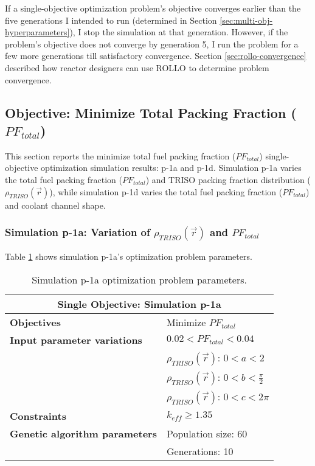 If a single-objective optimization problem's objective converges earlier than the 
five generations I intended to run (determined in Section 
\ref{sec:multi-obj-hyperparameters}), I stop the simulation at that generation.
However, if the problem's objective does not converge by generation 5, I run the 
problem for a few more generations till satisfactory convergence.
Section \ref{sec:rollo-convergence} described how reactor designers can use 
\gls{ROLLO} to determine problem convergence. 

\subsection{Objective: Minimize Total Packing Fraction ($PF_{total}$)}
\label{sec:plank-1-obj-pf}
This section reports the minimize total fuel packing fraction 
($PF_{total}$) single-objective optimization simulation results: p-1a and p-1d. 
Simulation p-1a varies the total fuel packing fraction ($PF_{total}$) and \gls{TRISO} 
packing fraction distribution ($\rho_{TRISO}(\vec{r})$), while simulation p-1d varies 
the total fuel packing fraction ($PF_{total}$) and coolant channel shape. 

\subsubsection{Simulation p-1a: Variation of $\rho_{TRISO}(\vec{r})$ and $PF_{total}$}
Table \ref{tab:simulationp1a} shows simulation p-1a's optimization problem parameters. 
\begin{table}[htbp!]
    \centering
    \onehalfspacing
    \caption{Simulation p-1a optimization problem parameters.}
	\label{tab:simulationp1a}
    \footnotesize
    \begin{tabular}{l|p{4cm}}
    \hline 
    \multicolumn{2}{c}{\textbf{Single Objective: Simulation p-1a}} \\
    \hline 
    \textbf{Objectives} & Minimize $PF_{total}$ \\
    \hline 
    \textbf{Input parameter variations} & $0.02<PF_{total}<0.04$ \\
    & $\rho_{TRISO}(\vec{r})$: $0<a<2$ \\
    & $\rho_{TRISO}(\vec{r})$: $0<b<\frac{\pi}{2}$ \\
    & $\rho_{TRISO}(\vec{r})$: $0<c<2\pi$ \\
    \hline
    \textbf{Constraints} & $k_{eff} \geq 1.35$\\ 
    \hline 
    \textbf{Genetic algorithm parameters} & Population size: 60 \\
    & Generations: 10 \\
    \hline
    \end{tabular}
\end{table}

